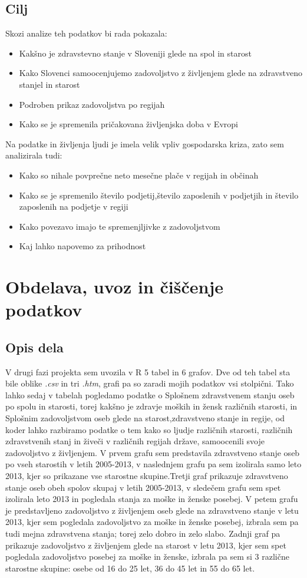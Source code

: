 \documentclass[11pt,a4paper]{article}
\begin{document}
\subsection{Cilj}
Skozi analize teh podatkov bi rada pokazala:
\begin{itemize}
\item Kakšno je zdravstevno stanje v Sloveniji glede na spol in starost
\item Kako Slovenci samoocenjujemo zadovoljstvo z življenjem glede na zdravstveno stanjel in starost 
\item Podroben prikaz zadovoljstva po regijah
\item Kako se je spremenila pričakovana življenjska doba v Evropi
\end{itemize}
Na podatke in življenja ljudi je imela velik vpliv gospodarska kriza, zato sem analizirala tudi:
\begin{itemize}
\item Kako so nihale povprečne neto mesečne plače v regijah in občinah
\item Kako se je spremenilo število podjetij,število  zaposlenih v podjetjih in število zaposlenih na podjetje v regiji
\item Kako povezavo imajo te spremenjljivke z zadovoljstvom
\item Kaj lahko napovemo za prihodnost
\end{itemize}
\section{Obdelava, uvoz in čiščenje podatkov}
\subsection{Opis dela}
V drugi fazi projekta sem uvozila v R 5 tabel in 6 grafov. Dve od teh tabel sta bile oblike \textit{.csv} in tri \textit{.htm}, grafi pa so zaradi mojih podatkov vsi stolpični. Tako lahko sedaj v tabelah pogledamo podatke o Splošnem zdravstvenem stanju oseb po spolu in starosti, torej kakšno je zdravje moških in žensk različnih starosti, in Splošnim zadovoljstvom oseb glede na starost,zdravstveno stanje in regije, od koder lahko razbiramo podatke o tem kako so ljudje različnih starosti, različnih zdravstvenih stanj in živeči v različnih regijah države, samoocenili svoje zadovoljstvo z življenjem. V prvem grafu sem predstavila zdravstveno stanje oseb po vseh starostih v letih 2005-2013, v naslednjem grafu pa sem izolirala samo leto 2013, kjer so prikazane vse starostne skupine.Tretji graf prikazuje zdravstveno stanje oseb obeh spolov skupaj v letih 2005-2013, v sledečem grafu sem spet izolirala leto 2013 in pogledala stanja za moške in ženske posebej. V petem grafu je predstavljeno zadovoljstvo z življenjem oseb glede na zdravstveno stanje v letu 2013, kjer sem pogledala zadovoljstvo za moške in ženske posebej, izbrala sem pa tudi mejna zdravstvena stanja; torej zelo dobro in zelo slabo. Zadnji graf pa prikazuje zadovoljstvo z življenjem glede na starost v letu 2013, kjer sem spet pogledala zadovoljstvo posebej za moške in ženske, izbrala pa sem si 3 različne starostne skupine: osebe od 16 do 25 let, 36 do 45 let in 55 do 65 let.
\end{document}
